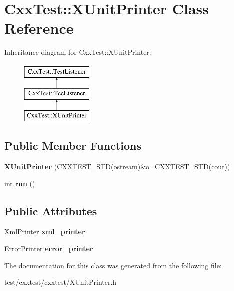 \hypertarget{classCxxTest_1_1XUnitPrinter}{\section{Cxx\-Test\-:\-:X\-Unit\-Printer Class Reference}
\label{classCxxTest_1_1XUnitPrinter}
}
Inheritance diagram for Cxx\-Test\-:\-:X\-Unit\-Printer\-:\begin{figure}[H]
\begin{center}
\leavevmode
\includegraphics[height=3.000000cm]{classCxxTest_1_1XUnitPrinter}
\end{center}
\end{figure}
\subsection*{Public Member Functions}
\begin{DoxyCompactItemize}
\item 
\hypertarget{classCxxTest_1_1XUnitPrinter_abe307d6a2123c77ca0ef727b259d82a2}{{\bfseries X\-Unit\-Printer} (C\-X\-X\-T\-E\-S\-T\-\_\-\-S\-T\-D(ostream)\&o=C\-X\-X\-T\-E\-S\-T\-\_\-\-S\-T\-D(cout))}\label{classCxxTest_1_1XUnitPrinter_abe307d6a2123c77ca0ef727b259d82a2}

\item 
\hypertarget{classCxxTest_1_1XUnitPrinter_ad7009e9ee46e5368b017b61dd2df5c2c}{int {\bfseries run} ()}\label{classCxxTest_1_1XUnitPrinter_ad7009e9ee46e5368b017b61dd2df5c2c}

\end{DoxyCompactItemize}
\subsection*{Public Attributes}
\begin{DoxyCompactItemize}
\item 
\hypertarget{classCxxTest_1_1XUnitPrinter_a6472987cc9041e9b361b0467476ec731}{\hyperlink{classCxxTest_1_1XmlPrinter}{Xml\-Printer} {\bfseries xml\-\_\-printer}}\label{classCxxTest_1_1XUnitPrinter_a6472987cc9041e9b361b0467476ec731}

\item 
\hypertarget{classCxxTest_1_1XUnitPrinter_ac4e23bae2351bfc03a0c41e718df758f}{\hyperlink{classCxxTest_1_1ErrorPrinter}{Error\-Printer} {\bfseries error\-\_\-printer}}\label{classCxxTest_1_1XUnitPrinter_ac4e23bae2351bfc03a0c41e718df758f}

\end{DoxyCompactItemize}


The documentation for this class was generated from the following file\-:\begin{DoxyCompactItemize}
\item 
test/cxxtest/cxxtest/X\-Unit\-Printer.\-h\end{DoxyCompactItemize}
